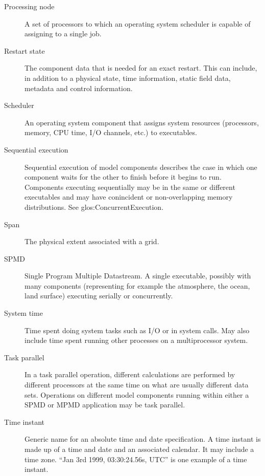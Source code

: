 \begin{description}
\item[Processing node] \label{glos:Pnode} A set of processors to which an
  operating system scheduler is capable of assigning to a single job.

\item[Restart state] \label{glos:RestartState} The component 
  data that 
  is needed for an exact restart. This can include, in addition to 
  a physical state,  time information, static field data,
  metadata and control information. 

\item[Scheduler] \label{glos:Scheduler} An operating system component 
  that assigns system
  resources (processors, memory, CPU time, I/O channels, etc.) to
  executables.

\item[Sequential execution] \label{glos:SequentialExecution}
Sequential execution of model components describes the case in which 
one component waits for the other to finish before it begins
to run.  Components executing sequentially may be in the same or 
different executables and may have conincident or non-overlapping 
memory distributions.  See 
{glos:ConcurrentExecution}.

\item[Span] \label{glos:Span} The physical extent associated with a grid.

\item[SPMD] \label{glos:SPMD} Single Program Multiple Datastream. 
  A single executable, possibly with many 
  components (representing for example the atmosphere, the ocean, 
  land surface) executing serially or concurrently.

\item [System time] \label{glos:SysTime}Time spent doing system tasks such as I/O or in system calls.  May also
include time spent running other processes on a multiprocessor system.

\item[Task parallel] \label{glos:TaskParallel}  In a task parallel operation,
different calculations are performed by different processors at the same time
on what are usually different data sets.  Operations on different model 
components running within either a SPMD or MPMD application may be task 
parallel.  

\item [Time instant] \label{glos:TimeInstant}
Generic name for an absolute time and date specification. A time instant is made 
up of a time and date and an associated calendar. It may include a time zone.
``Jan 3rd 1999, 03:30:24.56s, UTC'' is one example of a time instant.


\end{description}
